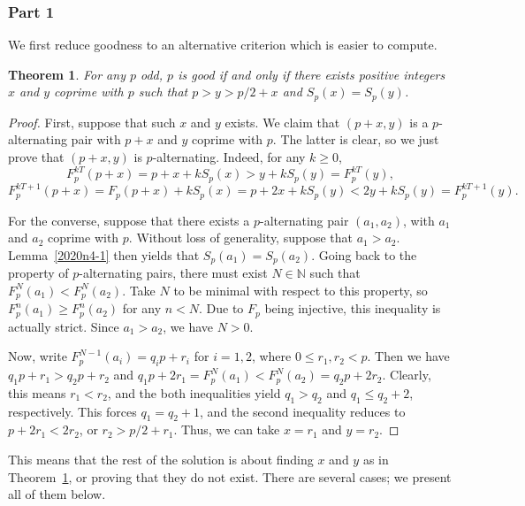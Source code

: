 \documentclass{article}
\newtheorem{theorem}{Theorem}
\newcommand{\N}{\mathbb{N}}
\begin{document}
\subsubsection*{Part 1}

We first reduce goodness to an alternative criterion which is easier to compute.

\begin{theorem}\label{2020n4-2}
For any $p$ odd, $p$ is good if and only if there exists positive integers $x$ and $y$ coprime with $p$ such that $p > y > p/2 + x$ and $S_p(x) = S_p(y)$.
\end{theorem}
\begin{proof}
First, suppose that such $x$ and $y$ exists.
We claim that $(p + x, y)$ is a $p$-alternating pair with $p + x$ and $y$ coprime with $p$.
The latter is clear, so we just prove that $(p + x, y)$ is $p$-alternating.
Indeed, for any $k \geq 0$,
\[ F_p^{kT}(p + x) = p + x + k S_p(x) > y + k S_p(y) = F_p^{kT}(y), \]
\[ F_p^{kT + 1}(p + x) = F_p(p + x) + k S_p(x) = p + 2x + k S_p(y) < 2y + k S_p(y) = F_p^{kT + 1}(y). \]

For the converse, suppose that there exists a $p$-alternating pair $(a_1, a_2)$, with $a_1$ and $a_2$ coprime with $p$.
Without loss of generality, suppose that $a_1 > a_2$.
Lemma~\ref{2020n4-1} then yields that $S_p(a_1) = S_p(a_2)$.
Going back to the property of $p$-alternating pairs, there must exist $N \in \N$ such that $F_p^N(a_1) < F_p^N(a_2)$.
Take $N$ to be minimal with respect to this property, so $F_p^n(a_1) \geq F_p^n(a_2)$ for any $n < N$.
Due to $F_p$ being injective, this inequality is actually strict.
Since $a_1 > a_2$, we have $N > 0$.

Now, write $F_p^{N - 1}(a_i) = q_i p + r_i$ for $i = 1, 2$, where $0 \leq r_1, r_2 < p$.
Then we have $q_1 p + r_1 > q_2 p + r_2$ and $q_1 p + 2 r_1 = F_p^N(a_1) < F_p^N(a_2) = q_2 p + 2 r_2$.
Clearly, this means $r_1 < r_2$, and the both inequalities yield $q_1 > q_2$ and $q_1 \leq q_2 + 2$, respectively.
This forces $q_1 = q_2 + 1$, and the second inequality reduces to $p + 2 r_1 < 2 r_2$, or $r_2 > p/2 + r_1$.
Thus, we can take $x = r_1$ and $y = r_2$.
\end{proof}

This means that the rest of the solution is about finding $x$ and $y$ as in Theorem~\ref{2020n4-2}, or proving that they do not exist.
There are several cases; we present all of them below.
\end{document}
